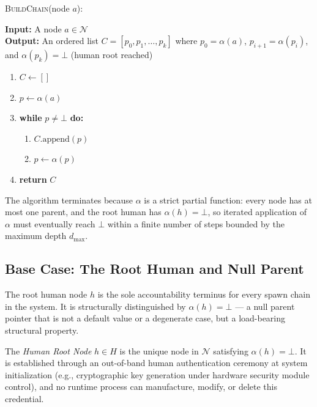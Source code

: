 \begin{algorithm}
\label{alg:chain-construction}
\textsc{BuildChain}(node $a$):
\begin{tabbing}
\textbf{Input:} A node $a \in \mathcal{N}$ \\
\textbf{Output:} An ordered list $C = [p_0, p_1, \ldots, p_k]$ where $p_0 = \alpha(a)$, $p_{i+1} = \alpha(p_i)$, and $\alpha(p_k) = \bot$ (human root reached)
\end{tabbing}
\begin{enumerate}
    \item $C \leftarrow []$
    \item $p \leftarrow \alpha(a)$
    \item \textbf{while } $p \neq \bot$ \textbf{do:}
        \begin{enumerate}
            \item $C.\text{append}(p)$
            \item $p \leftarrow \alpha(p)$
        \end{enumerate}
    \item \textbf{return } $C$
\end{enumerate}
\end{algorithm}

The algorithm terminates because $\alpha$ is a strict partial function: every node has at most one parent, and the root human has $\alpha(h) = \bot$, so iterated application of $\alpha$ must eventually reach $\bot$ within a finite number of steps bounded by the maximum depth $d_{\max}$.

\subsection{Base Case: The Root Human and Null Parent}
\label{sec:root-human-null-parent}

The root human node $h$ is the sole accountability terminus for every spawn chain in the system. It is structurally distinguished by $\alpha(h) = \bot$ — a null parent pointer that is not a default value or a degenerate case, but a load-bearing structural property.

\begin{dfn}
\label{dfn:human-root}
The \emph{Human Root Node} $h \in H$ is the unique node in $\mathcal{N}$ satisfying $\alpha(h) = \bot$. It is established through an out-of-band human authentication ceremony at system initialization (e.g., cryptographic key generation under hardware security module control), and no runtime process can manufacture, modify, or delete this credential.
\end{dfn}

